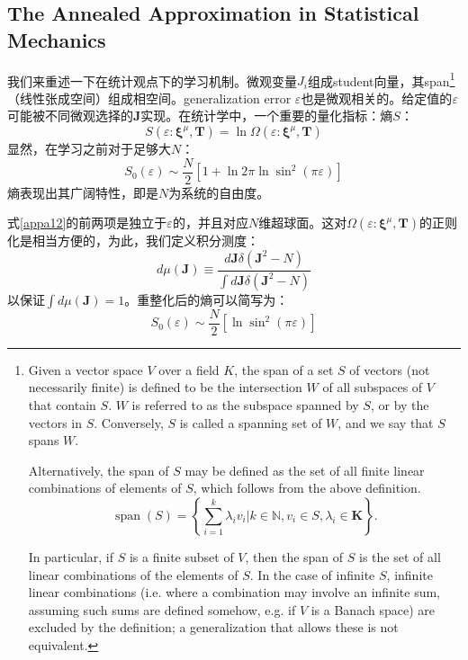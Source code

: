 \documentclass[11pt,fleqn, UTF8]{ctexbook} %
\begin{document}
\begin{subappendices}
\subsection{The Annealed Approximation in Statistical Mechanics}
我们来重述一下在统计观点下的学习机制。微观变量$J_i$组成student向量，其span\footnote{
Given a vector space $V$ over a field $K$, the span of a set $S$ of vectors (not necessarily finite) is defined to be the intersection $W$ of all subspaces of $V$ that contain $S$. $W$ is referred to as the subspace spanned by $S$, or by the vectors in $S$. Conversely, $S$ is called a spanning set of $W$, and we say that $S$ spans $W$.

Alternatively, the span of $S$ may be defined as the set of all finite linear combinations of elements of $S$, which follows from the above definition.
\begin{equation*}
  \operatorname{span}(S) =  \left \{ {\sum_{i=1}^k \lambda_i v_i \Big| k \in \mathbb{N}, v_i  \in S, \lambda _i  \in \mathbf{K}} \right \}.
\end{equation*}

In particular, if $S$ is a finite subset of $V$, then the span of $S$ is the set of all linear combinations of the elements of $S$. In the case of infinite $S$, infinite linear combinations (i.e. where a combination may involve an infinite sum, assuming such sums are defined somehow, e.g. if $V$ is a Banach space) are excluded by the definition; a generalization that allows these is not equivalent.
}（线性张成空间）组成相空间。generalization error $\varepsilon$也是微观相关的。给定值的$\varepsilon$可能被不同微观选择的$\boldsymbol{J}$实现。在统计学中，一个重要的量化指标：熵$S$：
\begin{equation}\label{appa11}
  S(\varepsilon:\boldsymbol{\xi}^{\mu},\boldsymbol{T})=\ln\Omega(\varepsilon:\boldsymbol{\xi}^{\mu},\boldsymbol{T})
\end{equation}
显然，在学习之前对于足够大$N$：
\begin{equation}\label{appa12}
  S_0(\varepsilon)\sim\frac{N}{2}[1+\ln2\pi\ln\sin^2(\pi\varepsilon)]
\end{equation}
熵表现出其广阔特性，即是$N$为系统的自由度。

式\ref{appa12}的前两项是独立于$\varepsilon$的，并且对应$N$维超球面。这对$\Omega(\varepsilon:\boldsymbol{\xi}^{\mu},\boldsymbol{T})$的正则化是相当方便的，为此，我们定义积分测度：
\begin{equation}\label{appa13}
  d\mu(\boldsymbol{J})\equiv\frac{d\boldsymbol{J}\delta(\boldsymbol{J}^2-N)}{\int d\boldsymbol{J}\delta(\boldsymbol{J}^2-N)}
\end{equation}
以保证$\int d\mu(\boldsymbol{J})=1$。重整化后的熵可以简写为：
\begin{equation}\label{appa14}
  S_0(\varepsilon)\sim\frac{N}{2}[\ln\sin^2(\pi\varepsilon)]
\end{equation}


\end{subappendices}
\end{document}

